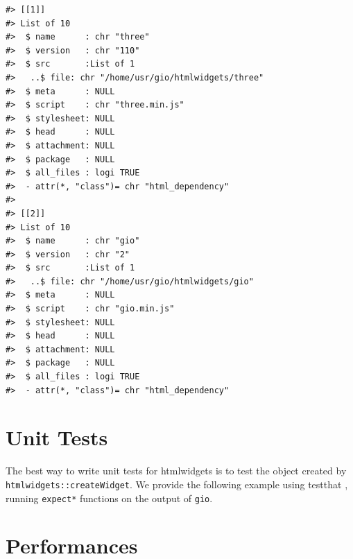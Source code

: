 \documentclass[10pt,]{krantz}
\makeatletter
\newenvironment{Shaded}{\begin{snugshade}}{\end{snugshade}}
\newcommand{\CommentTok}[1]{\textcolor[rgb]{0.37,0.37,0.37}{\textit{#1}}}
\newcommand{\KeywordTok}[1]{\textcolor[rgb]{0.27,0.27,0.27}{\textbf{#1}}}
\newcommand{\NormalTok}[1]{#1}
\newcommand{\OperatorTok}[1]{\textcolor[rgb]{0.43,0.43,0.43}{\textbf{#1}}}
\newcommand{\StringTok}[1]{\textcolor[rgb]{0.5,0.5,0.5}{#1}}
\newenvironment{kframe}{%
\medskip{}
\setlength{\fboxsep}{.8em}
 \def\at@end@of@kframe{}%
 \ifinner\ifhmode%
  \def\at@end@of@kframe{\end{minipage}}%
  \begin{minipage}{\columnwidth}%
 \fi\fi%
 \def\FrameCommand##1{\hskip\@totalleftmargin \hskip-\fboxsep
 \colorbox{shadecolor}{##1}\hskip-\fboxsep
     \hskip-\linewidth \hskip-\@totalleftmargin \hskip\columnwidth}%
 \MakeFramed {\advance\hsize-\width
   \@totalleftmargin\z@ \linewidth\hsize
   \@setminipage}}%
 {\par\unskip\endMakeFramed%
 \at@end@of@kframe}
\renewenvironment{Shaded}{\begin{kframe}}{\end{kframe}}
\makeatother
\begin{document}
\begin{verbatim}
#> [[1]]
#> List of 10
#>  $ name      : chr "three"
#>  $ version   : chr "110"
#>  $ src       :List of 1
#>   ..$ file: chr "/home/usr/gio/htmlwidgets/three"
#>  $ meta      : NULL
#>  $ script    : chr "three.min.js"
#>  $ stylesheet: NULL
#>  $ head      : NULL
#>  $ attachment: NULL
#>  $ package   : NULL
#>  $ all_files : logi TRUE
#>  - attr(*, "class")= chr "html_dependency"
#> 
#> [[2]]
#> List of 10
#>  $ name      : chr "gio"
#>  $ version   : chr "2"
#>  $ src       :List of 1
#>   ..$ file: chr "/home/usr/gio/htmlwidgets/gio"
#>  $ meta      : NULL
#>  $ script    : chr "gio.min.js"
#>  $ stylesheet: NULL
#>  $ head      : NULL
#>  $ attachment: NULL
#>  $ package   : NULL
#>  $ all_files : logi TRUE
#>  - attr(*, "class")= chr "html_dependency"
\end{verbatim}

\hypertarget{widgets-adv-unit-tests}{%
\section{Unit Tests}\label{widgets-adv-unit-tests}}

The best way to write unit tests for htmlwidgets is to test the object created by \texttt{htmlwidgets::createWidget}. We provide the following example using testthat \citep{R-testthat}, running \texttt{expect*} functions on the output of \texttt{gio}.

\begin{Shaded}
\end{Shaded}

\hypertarget{widgets-adv-performances}{%
\section{Performances}\label{widgets-adv-performances}}
\end{document}
